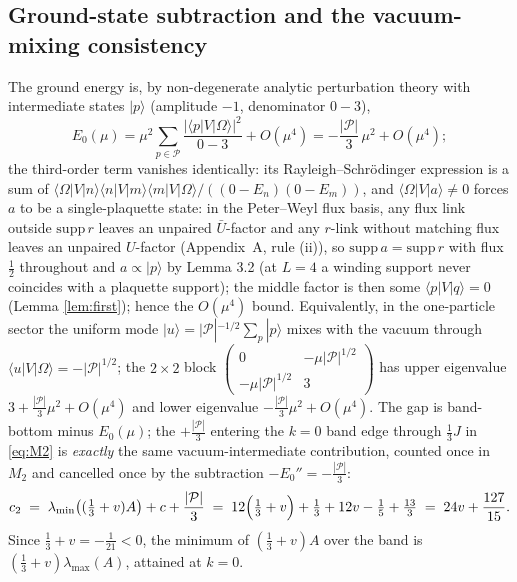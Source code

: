 \documentclass[11pt]{article}
\begin{document}
\subsection{Ground-state subtraction and the vacuum-mixing consistency}
The ground energy is, by non-degenerate analytic perturbation theory with
intermediate states $|p\rangle$ (amplitude $-1$, denominator $0-3$),
\[
E_0(\mu)=\mu^2\sum_{p\in\mathcal P}
\frac{|\langle p|V|\Omega\rangle|^2}{0-3}+O(\mu^4)
=-\frac{|\mathcal P|}{3}\,\mu^2+O(\mu^4) ;
\]
the third-order term vanishes identically: its Rayleigh--Schr\"odinger
expression is a sum of $\langle\Omega|V|n\rangle\langle n|V|m\rangle
\langle m|V|\Omega\rangle/((0-E_n)(0-E_m))$, and
$\langle\Omega|V|a\rangle\ne0$ forces $a$ to be a single-plaquette state:
in the Peter--Weyl flux basis, any flux link outside $\mathrm{supp}\,r$ leaves
an unpaired $\bar U$-factor and any $r$-link without matching flux leaves an
unpaired $U$-factor (Appendix~A, rule (ii)), so $\mathrm{supp}\,a=
\mathrm{supp}\,r$ with flux $\tfrac12$ throughout and $a\propto|p\rangle$ by
Lemma 3.2 (at $L=4$ a winding support never coincides with a plaquette
support); the middle factor is then some $\langle p|V|q\rangle=0$ (Lemma
\ref{lem:first}); hence the $O(\mu^4)$ bound. Equivalently, in the one-particle sector the uniform mode
$|u\rangle=|\mathcal P|^{-1/2}\sum_p|p\rangle$ mixes with the vacuum through
$\langle u|V|\Omega\rangle=-|\mathcal P|^{1/2}$; the $2\times2$ block
$\begin{pmatrix}0&-\mu|\mathcal P|^{1/2}\\ -\mu|\mathcal P|^{1/2}&3\end{pmatrix}$
has upper eigenvalue $3+\frac{|\mathcal P|}{3}\mu^2+O(\mu^4)$ and lower
eigenvalue $-\frac{|\mathcal P|}{3}\mu^2+O(\mu^4)$. The gap is
band-bottom minus $E_0(\mu)$; the $+\frac{|\mathcal P|}{3}$ entering the
$k=0$ band edge through $\frac13J$ in \eqref{eq:M2} is \emph{exactly} the
same vacuum-intermediate contribution, counted once in $M_2$ and cancelled
once by the subtraction $-E_0''=-\frac{|\mathcal P|}{3}$:
\begin{equation}\label{eq:c2}
c_2 \;=\; \lambda_{\min}\bigl((\tfrac13+v)A\bigr)+c+\frac{|\mathcal P|}{3}
\;=\;12\Bigl(\tfrac13+v\Bigr)+\tfrac13+12v-\tfrac15+\tfrac{13}{3}
\;=\;24v+\frac{127}{15}.
\end{equation}
Since $\tfrac13+v=-\tfrac1{21}<0$, the minimum of $(\tfrac13+v)A$ over the
band is $(\tfrac13+v)\lambda_{\max}(A)$, attained at $k=0$.
\end{document}
